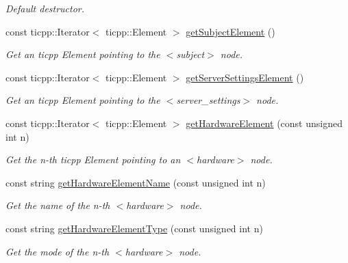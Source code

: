 \begin{DoxyCompactItemize}
\begin{DoxyCompactList}\small\item\em Default destructor. \item\end{DoxyCompactList}\item 
const ticpp::Iterator$<$ ticpp::Element $>$ \hyperlink{class_x_m_l_parser_ae6dc7710411e5ae25e741cd7bb47b5f7}{getSubjectElement} ()
\begin{DoxyCompactList}\small\item\em Get an ticpp Element pointing to the $<$subject$>$ node. \item\end{DoxyCompactList}\item 
const ticpp::Iterator$<$ ticpp::Element $>$ \hyperlink{class_x_m_l_parser_a45d67d3b0da7ae2708ae3a003db30f05}{getServerSettingsElement} ()
\begin{DoxyCompactList}\small\item\em Get an ticpp Element pointing to the $<$server\_\-settings$>$ node. \item\end{DoxyCompactList}\item 
const ticpp::Iterator$<$ ticpp::Element $>$ \hyperlink{class_x_m_l_parser_a47c7597267f5efbf1b91c9c5167e60da}{getHardwareElement} (const unsigned int n)
\begin{DoxyCompactList}\small\item\em Get the n-\/th ticpp Element pointing to an $<$hardware$>$ node. \item\end{DoxyCompactList}\item 
const string \hyperlink{class_x_m_l_parser_a94e96b54de258081ab16e2d91e690e22}{getHardwareElementName} (const unsigned int n)
\begin{DoxyCompactList}\small\item\em Get the name of the n-\/th $<$hardware$>$ node. \item\end{DoxyCompactList}\item 
const string \hyperlink{class_x_m_l_parser_a7e60c5073d31cb9fd83644cb58f9f010}{getHardwareElementType} (const unsigned int n)
\begin{DoxyCompactList}\small\item\em Get the mode of the n-\/th $<$hardware$>$ node. \item\end{DoxyCompactList}\item 

\end{DoxyCompactItemize}
